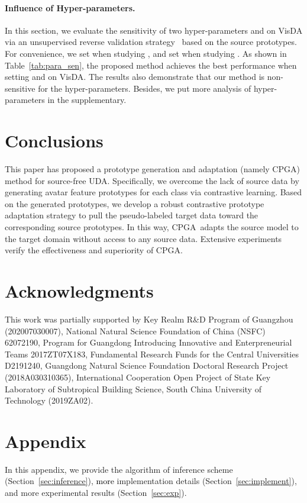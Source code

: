\documentclass{article}
\def\mata{\textcolor{black}}
\def\ournet{CPGA}
\begin{document}
\paragraph{Influence of Hyper-parameters.}

In this section, we evaluate the sensitivity of two hyper-parameters  and  on VisDA via an unsupervised reverse validation strategy~\cite{ganin2016domain} based on the source prototypes. 
For convenience, we set  when studying , and set  when studying .
As shown in Table~\ref{tab:para_sen}, the proposed method achieves the best performance when setting  and  on VisDA. 
The results also demonstrate that our method is non-sensitive for the hyper-parameters.
Besides, we put more analysis of hyper-parameters in the supplementary.


\section{Conclusions}
This paper has proposed a prototype generation and adaptation  (namely \ournet) method for source-free UDA. Specifically, we overcome the  lack of source data by generating avatar  feature prototypes for each class via contrastive learning. Based on the generated prototypes, we develop a robust contrastive prototype adaptation strategy to pull the pseudo-labeled target data toward the corresponding source prototypes. In this way, \ournet~adapts the source model to the target domain without access to any source data. Extensive experiments verify the effectiveness and superiority of \ournet.

\section*{Acknowledgments}
This work was partially supported by Key Realm R\&D Program of Guangzhou (202007030007), National Natural Science Foundation of China
(NSFC) 62072190, Program for Guangdong Introducing Innovative and Enterpreneurial Teams 2017ZT07X183, Fundamental Research Funds for the Central Universities D2191240, Guangdong Natural Science Foundation Doctoral Research Project (2018A030310365), International Cooperation Open Project of State Key Laboratory of Subtropical Building Science, South China University of Technology (2019ZA02).


\balance



\newpage


 
\section*{Appendix}
In this appendix, we provide the algorithm of inference scheme (Section~\ref{sec:inference}), \mata{more} implementation details (Section~\ref{sec:implement}), and more experimental results (Section~\ref{sec:exp}).
\end{document}
